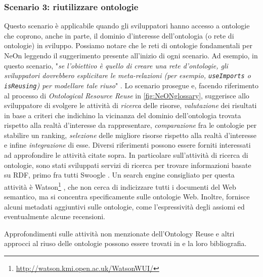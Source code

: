 \subsubsection*{Scenario 3: riutilizzare ontologie}
\label{sec:Scenario3}
Questo scenario è applicabile quando gli sviluppatori hanno accesso a ontologie che coprono, anche in parte, il dominio d'interesse dell'ontologia (o rete di ontologie) in sviluppo. Possiamo notare che le reti di ontologie fondamentali per NeOn leggendo il suggerimento presente all'inizio di ogni scenario. Ad esempio, in questo scenario, "\textsl{se l'obiettivo è quello di creare una rete d'ontologie, gli sviluppatori dovrebbero esplicitare le meta-relazioni (per esempio, \texttt{useImports} o \texttt{isReusing}) per modellare tale riuso}" \cite{NeOn}. Lo scenario prosegue e, facendo riferimento al processo di \textit{Ontological Resource Reuse} in \autoref{fig:NeONglossary}, suggerisce allo sviluppatore di svolgere le attività di \textit{ricerca} delle risorse, \textit{valutazione} dei risultati in base a criteri che indichino la vicinanza del dominio dell'ontologia trovata rispetto alla realtà d'interesse da rappresentare, \textit{comparazione} fra le ontologie per stabilire un ranking, \textit{selezione} delle migliore risorse rispetto alla realtà d'interesse e infine \textit{integrazione} di esse. Diversi riferimenti possono essere forniti interessati ad approfondire le attività citate sopra. In particolare sull'attività di ricerca di ontologie, sono stati sviluppati servizi di ricerca per trovare informazioni basate su RDF, primo fra tutti Swoogle \cite{swoogle}. Un search engine consigliato per questa attività è Watson\footnote{\url{http://watson.kmi.open.ac.uk/WatsonWUI/}} \cite{watson}, che non cerca di indicizzare tutti i documenti del Web semantico, ma si concentra specificamente sulle ontologie Web. Inoltre, fornisce alcuni metadati aggiuntivi sulle ontologie, come l'espressività degli assiomi ed eventualmente alcune recensioni.

Approfondimenti sulle attività non menzionate dell'Ontology Reuse e altri approcci al riuso delle ontologie possono essere trovati in \cite{carriero2020OntoReuse, caldarolaMultiStrategyApproach, ontologyEvaluation} e la loro bibliografia.
